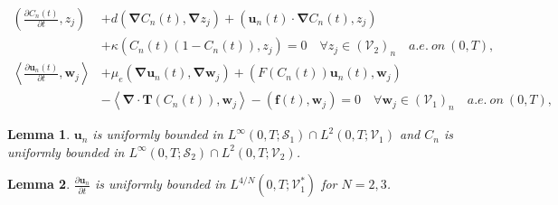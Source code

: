 \documentclass[10pt,a4paper]{amsart}
\newtheorem{lemma}{Lemma}
\begin{document}
\begin{align}
	\left(\frac{\partial C_n\left(t\right)}{\partial t},z_j\right) & + d\left(\boldsymbol{\nabla} C_n\left(t\right), \boldsymbol{\nabla} z_j\right)+\left(\mathbf{u}_n\left(t\right) \cdot \boldsymbol{\nabla} C_n\left(t\right),z_j\right)\nonumber \\ 
    & +\kappa \left(C_n\left(t\right)\left(1-C_n\left(t\right)\right),z_j\right) = 0 \quad \forall z_j \in \left(\mathscr V_2\right)_n \quad a.e. \ on \ \left(0,T\right), \label{eq: fdC} \\
	\left \langle  \frac{\partial \mathbf{u}_n\left(t\right)}{\partial t},\mathbf w_j \right \rangle & + \mu_e\left(\boldsymbol{\nabla} \mathbf{u}_n\left(t\right), \boldsymbol{\nabla} \mathbf w_j\right) + \left( F\left(C_n\left(t\right)\right)
 \mathbf{u}_n\left(t\right),\mathbf w_j\right) \nonumber \\ 
 & -\left \langle \boldsymbol{\nabla} \cdot \mathbf{T}\left(C_n\left(t\right)\right), \mathbf w_j \right \rangle - \left(\mathbf f\left(t\right),\mathbf w_j\right) = 0 \quad \forall \mathbf w_j \in \left(\mathscr V_1\right)_n \quad a.e. \ on \ \left(0,T\right)  \label{eq: fdu},
 \end{align} 

\begin{lemma}
	$\mathbf{u}_n$ is uniformly bounded in $L^\infty\left(0,T; \mathscr S_1\right)\cap L^2\left(0,T;\mathscr V_1\right)$ and $C_n$ is uniformly bounded in $L^\infty\left(0,T; \mathscr S_2\right)\cap L^2\left(0,T;\mathscr V_2\right)$.\label{lemma:L2}
\end{lemma}

\begin{lemma}
	$ \displaystyle \frac{\partial \mathbf{u}_n}{\partial t}$ is uniformly bounded in $L^{4/N}\left(0,T;\mathscr V_1^*\right)$ for $N=2,3$. \label{lemma:L4}
\end{lemma}
\end{document}
